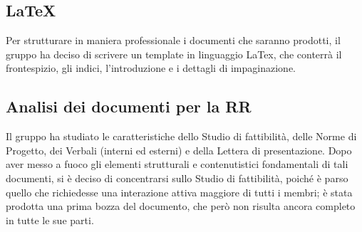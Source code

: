	\subsection{\LaTeX}
	Per strutturare in maniera professionale i documenti che saranno prodotti, il gruppo ha
	deciso di scrivere un template in linguaggio LaTex, che conterrà il frontespizio, gli indici,
	l'introduzione e i dettagli di impaginazione.

	\subsection{Analisi dei documenti per la RR}Il gruppo ha studiato le caratteristiche dello Studio di fattibilità, delle Norme di Progetto,
	dei Verbali (interni ed esterni) e della Lettera di presentazione. Dopo aver messo a fuoco gli
	elementi strutturali e contenutistici fondamentali di tali documenti, si è deciso di concentrarsi sullo
	Studio di fattibilità, poiché è parso quello che richiedesse una interazione attiva maggiore di tutti
	i membri; è stata prodotta una prima bozza del documento, che però non risulta ancora completo
	in tutte le sue parti.